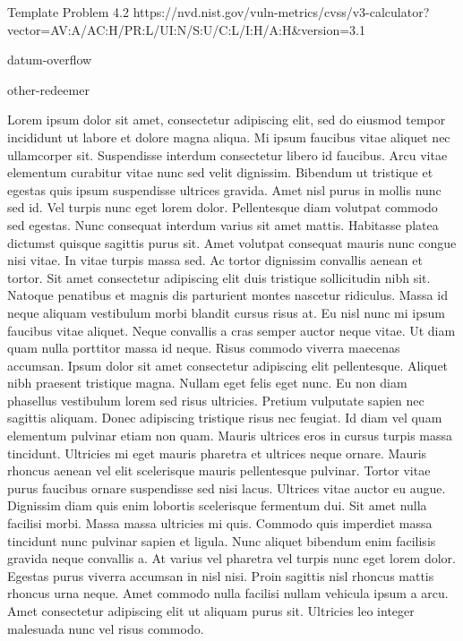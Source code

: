\vuln
    { %
      Template Problem
    }
    { %
      4.2
    }
    { %
      https://nvd.nist.gov/vuln-metrics/cvss/v3-calculator?vector=AV:A/AC:H/PR:L/UI:N/S:U/C:L/I:H/A:H&version=3.1
    }
    { %
    \item datum-overflow
    \item other-redeemer
    }
    { %
      Lorem ipsum dolor sit amet, consectetur adipiscing elit, sed do eiusmod tempor incididunt ut labore et dolore magna aliqua. Mi ipsum faucibus vitae aliquet nec ullamcorper sit. Suspendisse interdum consectetur libero id faucibus. Arcu vitae elementum curabitur vitae nunc sed velit dignissim. Bibendum ut tristique et egestas quis ipsum suspendisse ultrices gravida. Amet nisl purus in mollis nunc sed id. Vel turpis nunc eget lorem dolor. Pellentesque diam volutpat commodo sed egestas. Nunc consequat interdum varius sit amet mattis. Habitasse platea dictumst quisque sagittis purus sit. Amet volutpat consequat mauris nunc congue nisi vitae. In vitae turpis massa sed. Ac tortor dignissim convallis aenean et tortor. Sit amet consectetur adipiscing elit duis tristique sollicitudin nibh sit. Natoque penatibus et magnis dis parturient montes nascetur ridiculus. Massa id neque aliquam vestibulum morbi blandit cursus risus at. Eu nisl nunc mi ipsum faucibus vitae aliquet.
    }
    { %
      Neque convallis a cras semper auctor neque vitae. Ut diam quam nulla porttitor massa id neque. Risus commodo viverra maecenas accumsan. Ipsum dolor sit amet consectetur adipiscing elit pellentesque. Aliquet nibh praesent tristique magna. Nullam eget felis eget nunc. Eu non diam phasellus vestibulum lorem sed risus ultricies. Pretium vulputate sapien nec sagittis aliquam. Donec adipiscing tristique risus nec feugiat. Id diam vel quam elementum pulvinar etiam non quam. Mauris ultrices eros in cursus turpis massa tincidunt. Ultricies mi eget mauris pharetra et ultrices neque ornare. Mauris rhoncus aenean vel elit scelerisque mauris pellentesque pulvinar.
    }
    { %
      Tortor vitae purus faucibus ornare suspendisse sed nisi lacus. Ultrices vitae auctor eu augue. Dignissim diam quis enim lobortis scelerisque fermentum dui. Sit amet nulla facilisi morbi. Massa massa ultricies mi quis. Commodo quis imperdiet massa tincidunt nunc pulvinar sapien et ligula. Nunc aliquet bibendum enim facilisis gravida neque convallis a. At varius vel pharetra vel turpis nunc eget lorem dolor. Egestas purus viverra accumsan in nisl nisi. Proin sagittis nisl rhoncus mattis rhoncus urna neque. Amet commodo nulla facilisi nullam vehicula ipsum a arcu. Amet consectetur adipiscing elit ut aliquam purus sit. Ultricies leo integer malesuada nunc vel risus commodo.
    }
